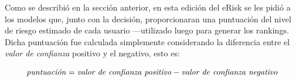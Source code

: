 
Como se describió en la sección anterior, en esta edición del eRisk se les pidió a los modelos que, junto con la decisión, proporcionaran una puntuación del nivel de riesgo estimado de cada usuario ---utilizado luego para generar los rankings.
Dicha puntuación fue calculada simplemente considerando la diferencia entre el \emph{valor de confianza} positivo y el negativo, esto es:

\begin{equation}
\text{\emph{puntuación}} = \text{\emph{valor de confianza positivo}} - \text{\emph{valor de confianza negativo}}
\label{eq:puntuacion}
\end{equation}


